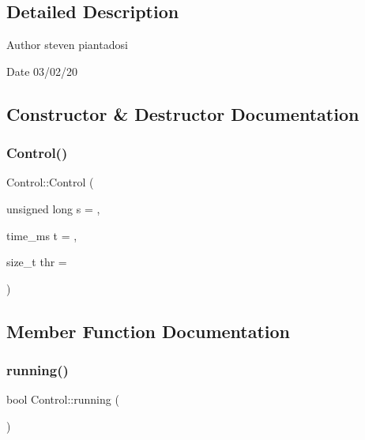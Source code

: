 \subsection{Detailed Description}
\begin{DoxyAuthor}{Author}
steven piantadosi 
\end{DoxyAuthor}
\begin{DoxyDate}{Date}
03/02/20 
\end{DoxyDate}


\subsection{Constructor \& Destructor Documentation}
\mbox{\label{struct_control_af442f77287fcc4f90d245ceaa5b0276f}} 
\subsubsection{\texorpdfstring{Control()}{Control()}}
{\footnotesize\ttfamily Control\+::\+Control (\begin{DoxyParamCaption}\item[{unsigned long}]{s = {},  }\item[{time\+\_\+ms}]{t = {},  }\item[{size\+\_\+t}]{thr = {} }\end{DoxyParamCaption})\hspace{0.3cm}{\ttfamily [inline]}}



\subsection{Member Function Documentation}
\mbox{\label{struct_control_a9217475a8ad619e7360524ae49c559a7}} 
\subsubsection{\texorpdfstring{running()}{running()}}
{\footnotesize\ttfamily bool Control\+::running (\begin{DoxyParamCaption}{ }\end{DoxyParamCaption})\hspace{0.3cm}{\ttfamily [inline]}}

